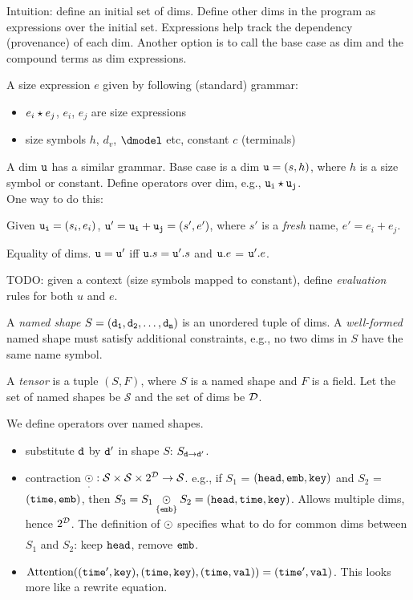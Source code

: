 Intuition: define an initial set of dims. Define other dims in the program as expressions over the initial set. Expressions help track the dependency (provenance) of each dim.
Another option is to call the base case as dim and the compound terms as dim expressions.

A size expression $e$ given by following (standard) grammar: 
\begin{itemize}
    \item $e_i \star e_j$, $e_i$, $e_j$ are size expressions
 \item size symbols $h$, $d_v$, $\dmodel$ etc, constant $c$ (terminals)
\end{itemize}

A dim ${\tt u}$ has a similar grammar. Base case is a dim ${\tt u} = (s, h)$, where $h$ is a size symbol or constant. Define operators over dim, e.g., ${\tt u_i} \star {\tt u_j}$. \\
 One way to do this:

Given ${\tt u_i} = (s_i, e_i)$, ${\tt u'} = {\tt u_i} + {\tt u_j} = (s', e')$, where $s'$ is a {\it fresh} name, $e' = e_i + e_j$.

Equality of dims. ${\tt u} = {\tt u'}$ iff ${\tt u}.s = {\tt u'}.s$ and ${\tt u}.e$ = ${\tt u'}.e$.

TODO: given a context (size symbols mapped to constant), define {\it evaluation} rules for  both $u$ and $e$.

\newcommand{\nshape}{S}
\newcommand{\nsset}{\mathcal{S}}
A {\it named shape} $\nshape = (\ndim{d_1}, \ndim{d_2}, \ldots, \ndim{d_n})$ is an unordered tuple of dims. A {\it well-formed} named shape must satisfy additional constraints, e.g., no two dims in $\nshape$ have the same name symbol.

A {\it tensor} is a tuple $(\nshape, F)$, where $\nshape$ is a named shape and $F$ is a field. Let the set of named shapes be $\nsset$ and the set of dims be ${\mathcal D}$.

We define operators over named shapes.
\begin{itemize}
    \item substitute ${\tt d}$ by ${\tt d'}$ in shape $\nshape$: $\nshape_{\ndim{d} \rightarrow \ndim{d'}}$.
    
    \item contraction $\opmult{\cdot}: \nsset \times \nsset \times 2^\dimset \rightarrow \nsset$. e.g., if $\nshape_1$ = $({\tt head}, {\tt emb}, {\tt key})$ and $\nshape_2$ = $({\tt time}, {\tt emb})$, then $\nshape_3 = S_1 \opmult{\{\ndim{emb}\}} S_2 = (\ndim{head},\ndim{time}, \ndim{key})$. Allows multiple dims, hence $2^{\mathcal D}$. The definition of $\underset{}{\odot}$ specifies what to do for common dims between $S_1$ and $S_2$: keep ${\tt head}$, remove ${\tt emb}$.
    
    \item $\text{Attention} ( ({\tt time'}, {\tt key}), ({\tt time}, {\tt key}), ({\tt time}, {\tt val}) ) = ({\tt time'}, {\tt val})$. This looks more like a rewrite equation.

\end{itemize}

